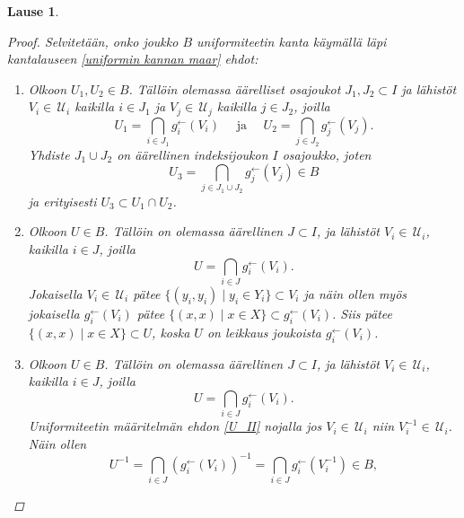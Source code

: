 \documentclass[12pt,a4paper,leqno]{report}
\newcommand{\U}{\,\mathcal{U}}
\theoremstyle{plain}
\newtheorem{lause}[equation]{Lause}
\theoremstyle{definition}
\theoremstyle{remark}
\begin{document}
\begin{lause}
\begin{proof}
Selvitetään, onko joukko $B$ uniformiteetin kanta käymällä läpi 
kantalauseen \ref{uniformin kannan maar} ehdot:
\begin{enumerate} %
\item[\ref{B_I}] 
Olkoon $U_1,U_2\in B$. 
Tällöin olemassa äärelliset osajoukot $J_1,J_2\subset I$ 
ja lähistöt $V_i\in\U_i$ kaikilla $i\in J_1$ 
ja $V_j\in\U_j$ kaikilla $j\in J_2$, 
joilla 
\begin{equation*}
U_1=\bigcap_{i\in J_1}g^{\leftarrow}_{i}(V_{i})\quad\text{ ja 
 }\quad U_2=\bigcap_{j\in J_2}g^{\leftarrow}_{j}(V_{j}).
\end{equation*}
Yhdiste $J_1\cup J_2$ on äärellinen indeksijoukon $I$ osajoukko, 
joten 
 $$U_3=\bigcap_{j\in J_1\cup J_2}g^{\leftarrow}_{j}(V_{j})\in B$$
 ja erityisesti $U_3\subset U_1\cap U_2$.
\item[\ref{U'_I}] 
Olkoon $U\in B$. Tällöin on olemassa äärellinen $J\subset I$, 
ja lähistöt $V_i\in\U_i$, kaikilla $i\in J$, 
joilla
\begin{equation*}
U=\bigcap_{i\in J}g^{\leftarrow}_{i}(V_{i}).
\end{equation*}
Jokaisella $V_i\in \U_i$ pätee $\{(y_i,y_i)\mid y_i\in Y_i\}\subset V_i$ 
ja näin ollen myös jokaisella $g_i^{\leftarrow}(V_i)$ pätee 
$\{(x,x)\mid x\in X\}\subset g_i^{\leftarrow}(V_i)$. 
Siis pätee $\{(x,x)\mid x\in X\}\subset U$, 
koska $U$ on leikkaus joukoista $g_i^{\leftarrow}(V_i)$.
\item[\ref{U'_II}] 
Olkoon $U\in B$. Tällöin on olemassa äärellinen $J\subset I$, 
ja lähistöt $V_i\in\U_i$, kaikilla $i\in J$, 
joilla
\begin{equation*}
U=\bigcap_{i\in J}g^{\leftarrow}_{i}(V_{i}).
\end{equation*}
Uniformiteetin määritelmän ehdon \ref{U_II} nojalla jos $V_i\in\U_i$ niin $V^{-1}_i\in\U_i$. 
Näin ollen 
\begin{equation*}
U^{-1}=\bigcap_{i\in J}(g^{\leftarrow}_{i}(V_{i}))^{-1}
=\bigcap_{i\in J}g^{\leftarrow}_{i}(V^{-1}_{i})\in B,

\end{equation*}
\end{enumerate}
\end{proof}
\end{lause}
\end{document}
